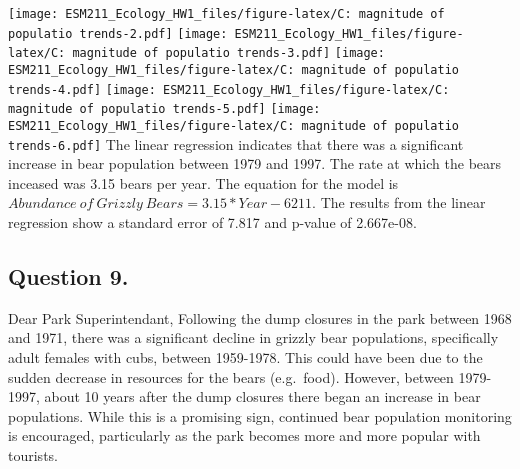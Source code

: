 \documentclass[]{article}
\begin{document}
\texttt{[image: ESM211\_Ecology\_HW1\_files/figure-latex/C: magnitude of populatio trends-2.pdf]}
\texttt{[image: ESM211\_Ecology\_HW1\_files/figure-latex/C: magnitude of populatio trends-3.pdf]}
\texttt{[image: ESM211\_Ecology\_HW1\_files/figure-latex/C: magnitude of populatio trends-4.pdf]}
\texttt{[image: ESM211\_Ecology\_HW1\_files/figure-latex/C: magnitude of populatio trends-5.pdf]}
\texttt{[image: ESM211\_Ecology\_HW1\_files/figure-latex/C: magnitude of populatio trends-6.pdf]}
The linear regression indicates that there was a significant increase in
bear population between 1979 and 1997. The rate at which the bears
inceased was 3.15 bears per year. The equation for the model is
\(Abundance~of~Grizzly~Bears = 3.15*Year - 6211\). The results from the
linear regression show a standard error of 7.817 and p-value of
2.667e-08.

\hypertarget{question-9.}{%
\subsection{Question 9.}\label{question-9.}}

Dear Park Superintendant, \parindent Following the dump closures in the
park between 1968 and 1971, there was a significant decline in grizzly
bear populations, specifically adult females with cubs, between
1959-1978. This could have been due to the sudden decrease in resources
for the bears (e.g.~food). However, between 1979-1997, about 10 years
after the dump closures there began an increase in bear populations.
While this is a promising sign, continued bear population monitoring is
encouraged, particularly as the park becomes more and more popular with
tourists.
\end{document}
